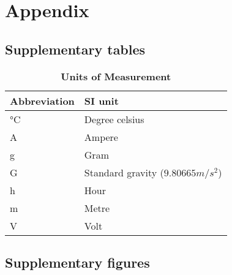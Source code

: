 \chapter[Appendix]{Appendix}\label{sec:appendix}

\section*{Supplementary tables}\label{sec:supp_tables}

\begin{table}[H]
    \caption[\textbf{Units of Measurement}]{\textbf{Units of Measurement}}
    \begin{tabular}{p{}p{}}
     \textbf{Abbreviation} & \textbf{SI unit} \\
     \hline \hline
°C & Degree celsius \\
A & Ampere \\
g & Gram \\
G & Standard gravity ($9.80665 m/s^2$) \\
h & Hour \\
m & Metre \\
V & Volt \\
     \hline
    \end{tabular}
    \label{tab:tab_label}
\end{table}

\clearpage
\FloatBarrier

\section*{Supplementary figures}\label{sec:supp_figures}

